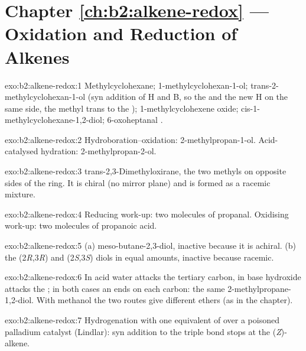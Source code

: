 \section*{Chapter \ref{ch:b2:alkene-redox} --- Oxidation and Reduction of Alkenes}

\begin{solution}{exo:b2:alkene-redox:1}
Methylcyclohexane; 1-methylcyclohexan-1-ol; trans-2-methylcyclohexan-1-ol (syn addition of
H and B, so the  and the new H on the same side, the methyl trans to the );
1-methylcyclohexene oxide; cis-1-methylcyclohexane-1,2-diol; 6-oxoheptanal
.
\end{solution}

\begin{solution}{exo:b2:alkene-redox:2}
Hydroboration--oxidation: 2-methylpropan-1-ol. Acid-catalysed hydration:
2-methylpropan-2-ol.
\end{solution}

\begin{solution}{exo:b2:alkene-redox:3}
trans-2,3-Dimethyloxirane, the two methyls on opposite sides of the ring. It is chiral (no
mirror plane) and is formed as a racemic mixture.
\end{solution}

\begin{solution}{exo:b2:alkene-redox:4}
Reducing work-up: two molecules of propanal. Oxidising work-up: two molecules of propanoic
acid.
\end{solution}

\begin{solution}{exo:b2:alkene-redox:5}
(a) meso-butane-2,3-diol, inactive because it is achiral. (b) the
(2\textit{R},3\textit{R}) and (2\textit{S},3\textit{S}) diols in equal amounts, inactive
because racemic.
\end{solution}

\begin{solution}{exo:b2:alkene-redox:6}
In acid water attacks the tertiary carbon, in base hydroxide attacks the ; in both
cases an  ends on each carbon: the same 2-methylpropane-1,2-diol. With methanol the two
routes give different ethers (as in the chapter).
\end{solution}

\begin{solution}{exo:b2:alkene-redox:7}
Hydrogenation with one equivalent of  over a poisoned palladium catalyst
(Lindlar): syn addition to the triple bond stops at the (\textit{Z})-alkene.
\end{solution}

